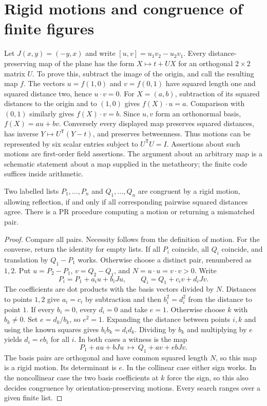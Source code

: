 \section{Rigid motions and congruence of finite figures}
\label{sec:motions}
Let $J(x,y)=(-y,x)$ and write $[u,v]=u_1v_2-u_2v_1$.
Every distance-preserving map of the plane has the form
$X\mapsto t+UX$ for an orthogonal $2\times2$ matrix $U$. To prove this,
subtract the image of the origin, and call the resulting map $f$. The
vectors $u=f(1,0)$ and $v=f(0,1)$ have squared length one and squared
distance two, hence $u\cdot v=0$. For $X=(a,b)$, subtraction of its
squared distances to the origin and to $(1,0)$ gives
$f(X)\cdot u=a$. Comparison with $(0,1)$ similarly gives
$f(X)\cdot v=b$. Since $u,v$ form an orthonormal basis, $f(X)=au+bv$.
Conversely every displayed map preserves squared distances, has inverse
$Y\mapsto U^{\mathsf T}(Y-t)$, and preserves betweenness. Thus motions
can be represented by six scalar entries subject to $U^{\mathsf T}U=I$.
Assertions about such motions are first-order field assertions. The
argument about an arbitrary map is a schematic statement about a map
supplied in the metatheory; the finite code suffices inside arithmetic.

\begin{proposition}
Two labelled lists $P_1,\ldots,P_n$ and $Q_1,\ldots,Q_n$ are congruent by
a rigid motion, allowing reflection, if and only if all corresponding
pairwise squared distances agree. There is a PR procedure computing a
motion or returning a mismatched pair.
\end{proposition}
\begin{proof}
Compare all pairs. Necessity follows from the definition of motion.
For the converse, return the identity for empty lists. If all $P_i$
coincide, all $Q_i$ coincide, and translation by $Q_1-P_1$ works.
Otherwise choose a distinct pair, renumbered as $1,2$. Put
$u=P_2-P_1$, $v=Q_2-Q_1$, and $N=u\cdot u=v\cdot v>0$.
Write
\[
   P_i=P_1+a_i u+b_i Ju,\qquad Q_i=Q_1+c_i v+d_i Jv .
\]
The coefficients are dot products with the basis vectors divided by
$N$. Distances to points $1,2$ give $a_i=c_i$ by subtraction and then
$b_i^2=d_i^2$ from the distance to point $1$. If every $b_i=0$, every
$d_i=0$ and take $e=1$. Otherwise choose $k$ with $b_k\ne0$. Set
$e=d_k/b_k$, so $e^2=1$. Expanding the distance between points $i,k$
and using the known squares gives $b_i b_k=d_i d_k$. Dividing by $b_k$
and multiplying by $e$ yields $d_i=e b_i$ for all $i$. In both cases a
witness is the map
\[
 P_1+au+bJu\ \longmapsto\ Q_1+av+e bJv .
\]
The basis pairs are orthogonal and have common squared length $N$, so
this map is a rigid motion. Its determinant is $e$. In the collinear
case either sign works. In the noncollinear case the two basis
coefficients at $k$ force the sign, so this also decides congruence by
orientation-preserving motions. Every search ranges over a given finite
list.
\end{proof}


